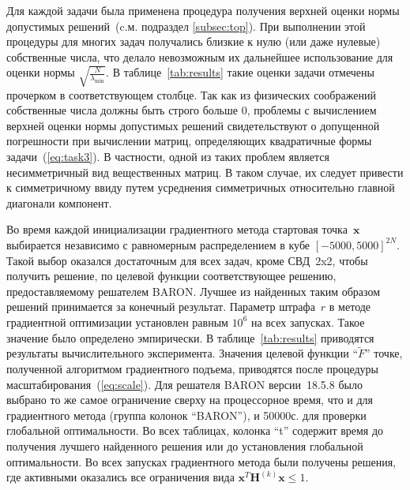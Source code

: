 Для каждой задачи была применена процедура получения верхней оценки нормы допустимых решений~(c.м. подраздел \ref{subsec:top}). При выполнении этой процедуры для многих задач получались близкие к нулю (или даже нулевые) собственные числа, что делало невозможным их дальнейшее использование для оценки нормы $\sqrt{\frac{N}{\lambda_{\min}}}$. В таблице~\ref{tab:results} такие оценки задачи отмечены прочерком в соответствующем столбце. Так как из физических соображений собственные числа должны быть строго больше 0, проблемы с вычислением верхней оценки нормы допустимых решений свидетельствуют о допущенной погрешности при вычислении матриц, определяющих квадратичные формы задачи~(\ref{eq:task3}). В частности, одной из таких проблем является несимметричный вид вещественных матриц. В таком случае, их следует привести к симметричному ввиду путем усреднения симметричных относительно главной диагонали компонент.

Во время каждой инициализации градиентного метода стартовая точка~$\textbf{x}$ выбирается независимо с равномерным распределением в кубе $[-5000, 5000]^{2N}$. Такой выбор оказался достаточным для всех задач, кроме СВД~2x2, чтобы получить решение, по целевой функции соответствующее решению, предоставляемому решателем BARON. Лучшее из найденных таким образом решений принимается за конечный результат. Параметр штрафа~$r$ в методе градиентной оптимизации установлен равным $10^6$ на всех запусках. Такое значение было определено эмпирически. В таблице~\ref{tab:results} приводятся результаты вычислительного эксперимента. Значения целевой функции ``$\tilde{F}$'' точке, полученной алгоритмом градиентного подъема, приводятся после процедуры масштабирования~(\ref{eq:scale}). Для решателя BARON версии~18.5.8 было выбрано то же самое ограничение сверху на процессорное время, что и для градиентного метода (группа колонок ``BARON''), и 50000с. для проверки глобальной оптимальности. Во всех таблицах, колонка ``t'' содержит время до получения лучшего найденного решения или до установления глобальной оптимальности. Во всех запусках градиентного метода были получены решения, где активными оказались все ограничения вида $\textbf{x}^{T}\textbf{H}^{(k)}\textbf{x} \leq 1$.

